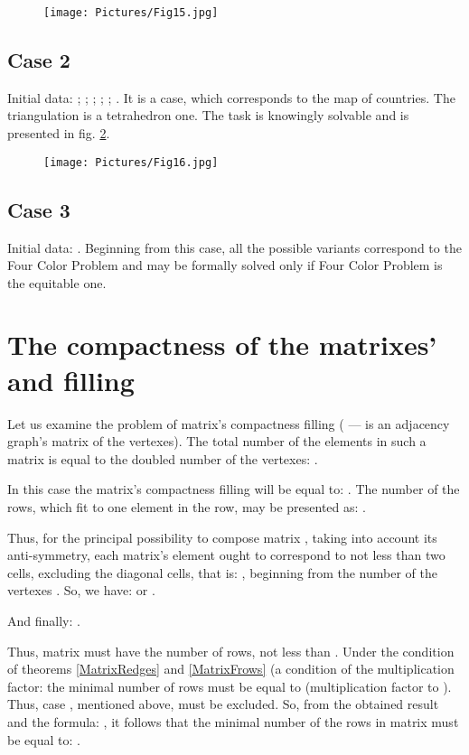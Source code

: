 \documentclass{amsart}
\theoremstyle{plain}
\numberwithin{equation}{section}
\begin{document}
\begin{figure}[htb]
		\texttt{[image: Pictures/Fig15.jpg]}
	\caption{}
	\label{Fig:15}
\end{figure}

\subsection {Case 2}

Initial data: ; ; ; ; ; .  
It is a case, which corresponds to the map of  countries. The triangulation is a tetrahedron one. The task is knowingly solvable and is presented in fig. \ref{Fig:16}.

\begin{figure}[htb]
	\texttt{[image: Pictures/Fig16.jpg]}
	\caption{}
	\label{Fig:16}
\end{figure}

\subsection {Case 3}

Initial data: . 
Beginning from this case, all the possible variants correspond to the Four Color Problem and may be formally solved only if Four Color Problem is the equitable one.

\section {The compactness of the matrixes'  and  filling}

Let us examine the problem of matrix's  compactness filling ( --- is an adjacency graph's  matrix of the vertexes). The total number of the elements in such a matrix is equal to the doubled number of the vertexes:
 .

In this case the matrix's compactness filling will be equal to: .
The number of the rows, which fit to one element in the row, may be presented as:  .

Thus, for the principal possibility to compose matrix , taking into account its anti-symmetry, each matrix's element ought to correspond to not less than two cells, excluding the diagonal cells, that is: , beginning from the number of the vertexes . So, we have:  or .

And finally: .

Thus, matrix  must have the number of rows, not less than . Under the condition of theorems \ref{MatrixRedges} and \ref{MatrixFrows} (a condition of the multiplication factor: the minimal number of rows must be equal to  (multiplication factor to ). Thus, case , mentioned above, must be excluded. So, from the obtained result and the formula: , it follows that the minimal number of the rows in matrix  must be equal to: .
\end{document}
